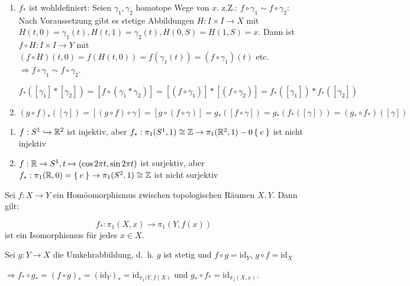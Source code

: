 \begin{beweis}
    \begin{enumerate}[label=\alph*)]
        \item $f_*$ ist wohldefiniert: Seien $\gamma_1, \gamma_2$ homotope
              Wege von $x$. z.Z.: $f \circ \gamma_1 \sim f \circ \gamma_2$:
              Nach Voraussetzung gibt es stetige Abbildungen $H:I\times I \rightarrow X$
              mit $H(t,0) = \gamma_1(t), H(t,1) = \gamma_2(t), H(0,S) = H(1, S) = x$.
              Dann ist $f \circ H: I \times I \rightarrow Y$ mit
               $(f \circ H)(t,0) = f(H(t,0)) = f(\gamma_1(t)) = (f \circ \gamma_1)(t)$
              etc. $\Rightarrow f \circ \gamma_1 \sim f \circ \gamma_2$.

              $f_*([\gamma_1] * [\gamma_2]) = [f \circ (\gamma_1 * \gamma_2)] = [(f \circ \gamma_1)] * [(f \circ \gamma_2)] = f_*([\gamma_1]) * f_*([\gamma_2])$
        \item $(g \circ f)_* ([\gamma]) = [(g \circ f) \circ \gamma] = [g \circ (f \circ \gamma)] = g_* ([f \circ \gamma]) = g_* (f_* ([\gamma])) = (g_* \circ f_*)([\gamma])$
    \end{enumerate}
\end{beweis}

\begin{beispiel}
    \begin{enumerate}[label=\arabic*)]
        \item $f:S^1 \hookrightarrow \mathbb{R}^2$ ist injektiv, aber 
              $f_*:\pi_1(S^1, 1) \cong \mathbb{Z} \rightarrow \pi_1(\mathbb{R}^2, 1) -0 \Set{e}$
              ist nicht injektiv
        \item $f: \mathbb{R} \rightarrow S^1, t \mapsto (\cos 2 \pi t, \sin 2 \pi t)$
              ist surjektiv, aber $f_*: \pi_1(\mathbb{R}, 0) = \Set{e} \rightarrow \pi_1(S^2, 1) \cong \mathbb{Z}$
              ist nicht surjektiv
    \end{enumerate}
\end{beispiel}

\begin{korollar}%
    Sei $f:X \rightarrow Y$ ein Homöomorphismus zwischen topologischen
    Räumen $X, Y$. Dann gilt:

    \[f_*: \pi_1(X,x) \rightarrow \pi_1(Y, f(x))\]
    ist ein Isomorphismus für jedes $x \in X$.
\end{korollar}

\begin{beweis}
    Sei $g: Y \rightarrow X$ die Umkehrabbildung, d.~h. $g$ ist stetig
    und $f \circ g = \text{id}_Y$, $g \circ f = \text{id}_X$

    $\Rightarrow f_* \circ g_* = (f \circ g)_* = (\text{id}_Y)_* = \text{id}_{\pi_1 (Y, f(X)}$
    und $g_* \circ f_* = \text{id}_{\pi_1(X,x)}$.
\end{beweis}

